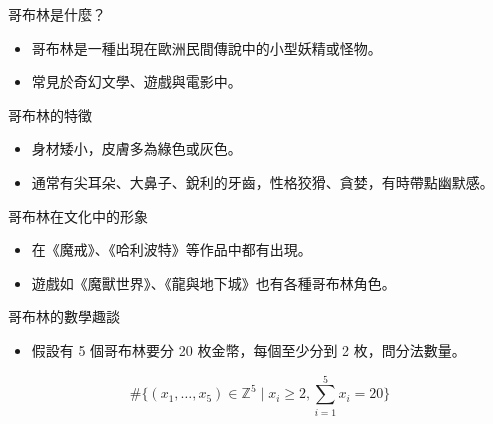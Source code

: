 \documentclass{beamer}
\begin{document}
\begin{frame}{哥布林是什麼？}
  \begin{itemize}
    \item 哥布林是一種出現在歐洲民間傳說中的小型妖精或怪物。
    \item 常見於奇幻文學、遊戲與電影中。
  \end{itemize}
\end{frame}

\begin{frame}{哥布林的特徵}
    \begin{itemize}
        \item 身材矮小，皮膚多為綠色或灰色。
        \item 通常有尖耳朵、大鼻子、銳利的牙齒，性格狡猾、貪婪，有時帶點幽默感。
    \end{itemize}
\end{frame}

\begin{frame}{哥布林在文化中的形象}
  \begin{itemize}
    \item 在《魔戒》、《哈利波特》等作品中都有出現。
    \item 遊戲如《魔獸世界》、《龍與地下城》也有各種哥布林角色。
  \end{itemize}
\end{frame}

\begin{frame}{哥布林的數學趣談}
  \begin{itemize}
    \item 假設有 5 個哥布林要分 20 枚金幣，每個至少分到 2 枚，問分法數量。
  \end{itemize}
  \[
    \#\{(x_1,\dots,x_5)\in\mathbb{Z}^5\mid x_i\ge2,\sum_{i=1}^5 x_i=20\}
  \]
\end{frame}
\end{document}
